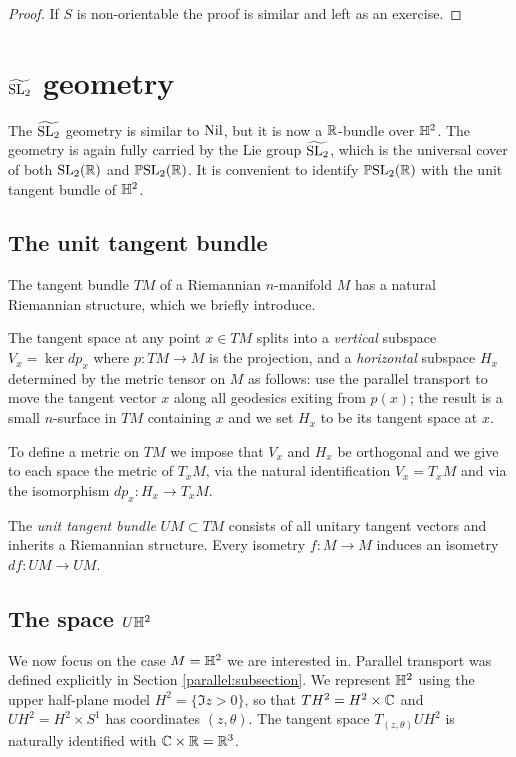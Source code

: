 \begin{proof}
If $S$ is non-orientable the proof is similar and left as an exercise.
\end{proof}

\section{$\widetilde{{\rm SL}_2}$ geometry}
The $\widetilde{{\rm SL}_2}$ geometry is similar to ${\rm Nil}$, but it is now a $\mathbb{R}$-bundle over $\mathbb{H}^2$. The geometry is again fully carried by the Lie group $\widetilde{{\rm SL}_2}$, which is the universal cover of both ${\rm SL}_2(\mathbb{R})$ and $\mathbb{P}{\rm SL}_2(\mathbb{R})$. It is convenient to identify $\mathbb{P}{\rm SL}_2(\mathbb{R})$ with the unit tangent bundle of $\mathbb{H}^2$.

\subsection{The unit tangent bundle}
The tangent bundle $TM$ of a Riemannian $n$-manifold $M$ has a natural Riemannian structure, which we briefly introduce.

The tangent space at any point $x\in TM$ splits into a \emph{vertical} subspace $V_x  = \ker dp_x$ where $p\colon TM \to M$ is the projection, and a \emph{horizontal} subspace $H_x $ determined by the metric tensor on $M$ as follows: use the parallel transport to move the tangent vector $x$ along all geodesics exiting from $p(x)$; the result is a small $n$-surface in $TM$ containing $x$ and we set $H_x$ to be its tangent space at $x$. 

To define a metric on $TM$ we impose that $V_x$ and $H_x$ be orthogonal and we give to each space the metric of $T_xM$, via the natural identification $V_x = T_xM$ and via the isomorphism $dp_x\colon H_x \to T_xM$. 

The \emph{unit tangent bundle} $UM\subset TM$ consists of all unitary tangent vectors and inherits a Riemannian structure. Every isometry $f\colon M \to M$ induces an isometry $df\colon UM \to UM$.


\subsection{The space $U\mathbb{H}^2$}
We now focus on the case $M=\mathbb{H}^2$ we are interested in. Parallel transport was defined explicitly in Section \ref{parallel:subsection}. 
We represent $\mathbb{H}^2$ using the upper half-plane model $H^2 = \{\Im z > 0\}$, so that $TH^2 = H^2 \times \mathbb{C}$ and $UH^2 = H^2 \times S^1$ has coordinates $(z,\theta)$. The tangent space $T_{(z,\theta)}UH^2$ is naturally identified with $\mathbb{C}\times \mathbb{R} = \mathbb{R}^3$.

